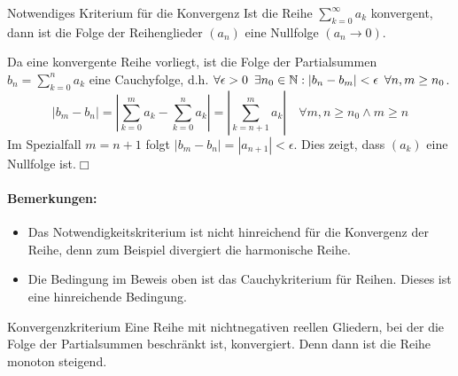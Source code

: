 \begin{satz}{Notwendiges Kriterium für die Konvergenz}
	Ist die Reihe $\sum_{k=0}^\infty a_k$ konvergent, dann ist die Folge der Reihenglieder $(a_n)$ eine Nullfolge $(a_n\rightarrow0)$.
\end{satz}
\beweis
Da eine konvergente Reihe vorliegt, ist die Folge der Partialsummen $b_n=\sum_{k=0}^n a_k$ eine Cauchyfolge, d.h. $\forall \epsilon>0\enspace\exists n_0\in\mathbb{N}:|b_n-b_m|<\epsilon\enspace\forall n,m\geq n_0$.
\begin{equation*}
	|b_m-b_n|=\left|\sum_{k=0}^m a_k-\sum_{k=0}^n a_k\right|=\left|\sum_{k=n+1}^m a_k\right| \quad\forall m,n\geq n_0\wedge m\geq n
\end{equation*}
Im Spezialfall $m=n+1$ folgt $|b_m-b_n|=|a_{n+1}|<\epsilon$. Dies zeigt, dass $(a_k)$ eine Nullfolge ist.\hfill$\Box$
\paragraph{Bemerkungen:}
\begin{itemize}
	\item Das Notwendigkeitskriterium ist nicht hinreichend für die Konvergenz der Reihe, denn zum Beispiel divergiert die harmonische Reihe.
	\item Die Bedingung im Beweis oben ist das Cauchykriterium für Reihen. Dieses ist eine hinreichende Bedingung.
\end{itemize}

\begin{lemma}{Konvergenzkriterium}
	Eine Reihe mit nichtnegativen reellen Gliedern, bei der die Folge der Partialsummen beschränkt ist, konvergiert. Denn dann ist die Reihe monoton steigend.
\end{lemma}





